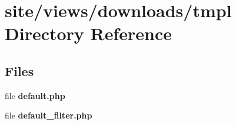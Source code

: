 \section{site/views/downloads/tmpl Directory Reference}
\label{dir_39e3f453cb7291ee3529a30ddb83bead}
\subsection*{Files}
\begin{DoxyCompactItemize}
\item 
file \textbf{ default.\+php}
\item 
file \textbf{ default\+\_\+filter.\+php}
\end{DoxyCompactItemize}
